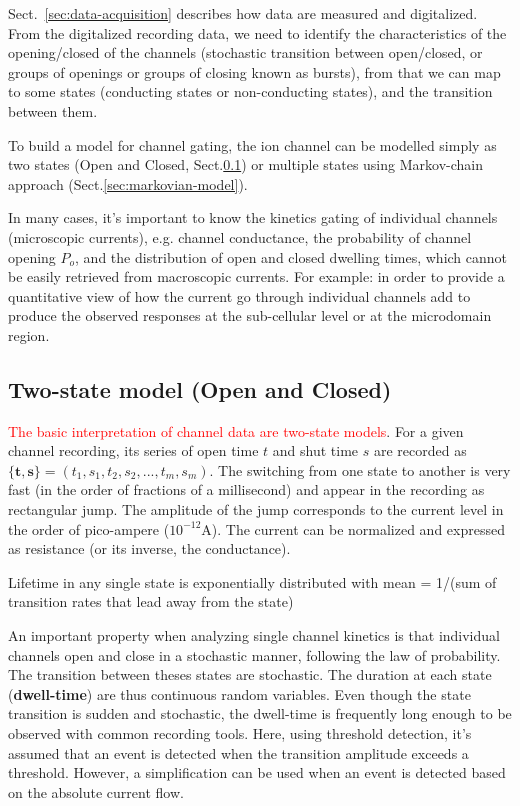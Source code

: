 Sect.~\ref{sec:data-acquisition} describes how data are measured and
digitalized. From the digitalized recording data, we need to identify the
characteristics of the opening/closed of the channels (stochastic transition
between open/closed, or groups of openings or groups of closing known as
bursts), from that we can map to some states (conducting states or
non-conducting states), and the transition between them.

To build a model for channel gating, the ion channel  can be modelled simply as
two states (Open and Closed, Sect.\ref{sec:single-channel-model_HH-based}) or
multiple states using Markov-chain approach (Sect.\ref{sec:markovian-model}).



\begin{framed}
In many cases, it's important to know the kinetics gating of individual channels
(microscopic currents), e.g. channel conductance, the probability of channel
opening $P_o$, and the distribution of open and closed dwelling times, which
cannot be easily retrieved from macroscopic currents.
For example: in order to provide a quantitative view of how the current go
through individual channels add to produce the observed responses at the
sub-cellular level or at the microdomain region.
\end{framed}

\subsection{Two-state model (Open and Closed)}
\label{sec:single-channel-model_HH-based}


\textcolor{red}{The basic interpretation of channel data are two-state models}.
For a given channel recording, its series of open time $t$ and shut time $s$ are
recorded as $\{\mathbf{t,s}\}=(t_1,s_1,t_2,s_2,...,t_m,s_m)$.  The switching
from one state to another is very fast (in the order of fractions of a
millisecond) and appear in the recording as rectangular jump. The amplitude of
the jump corresponds to the current level in the order of pico-ampere
($10^{-12}$A). The current can be normalized and expressed as resistance (or its
inverse, the conductance).

\begin{framed}
  Lifetime in any single state is exponentially distributed with mean
  = 1/(sum of transition rates that lead away from the state)
\end{framed}

An important property when analyzing single channel kinetics is that individual
channels open and close in a stochastic manner, following the law of
probability. The transition between theses states are stochastic. The duration
at each state ({\bf dwell-time}) are thus continuous random variables.  Even
though the state transition is sudden and stochastic, the dwell-time is
frequently long enough to be observed with common recording tools. Here, using
threshold detection, it's assumed that an event is detected when the transition
amplitude exceeds a threshold. However, a simplification can be used when an
event is detected based on the absolute current flow.

